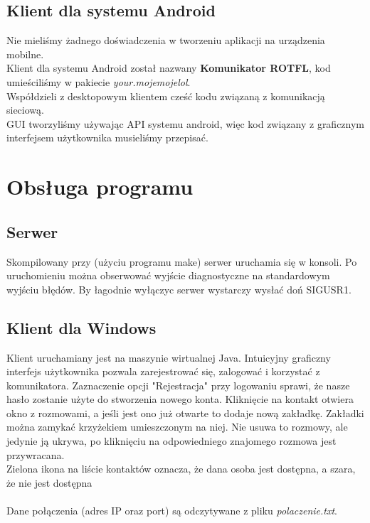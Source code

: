 \documentclass[10pt,a4paper]{article}
\begin{document}
	\subsection{Klient dla systemu Android}
		Nie mieliśmy żadnego doświadczenia w tworzeniu aplikacji na urządzenia mobilne.\\
		Klient dla systemu Android został nazwany \textbf{Komunikator ROTFL}, kod umieściliśmy w pakiecie \textit{your.mojemojelol}.\\
		Współdzieli z desktopowym klientem cześć kodu związaną z komunikacją sieciową.\\
		GUI tworzyliśmy używając API systemu android, więc kod związany z graficznym interfejsem użytkownika musieliśmy  przepisać.
	
\section{Obsługa programu}
	\subsection{Serwer}
		Skompilowany przy (użyciu programu make) serwer uruchamia się w konsoli.
		Po uruchomieniu można obserwować wyjście diagnostyczne na standardowym wyjściu błędów.
		By łagodnie wyłączyc serwer wystarczy wysłać doń SIGUSR1.
	\subsection{Klient dla Windows}
		Klient uruchamiany jest na maszynie wirtualnej Java.
		Intuicyjny graficzny interfejs użytkownika pozwala zarejestrować się, zalogować i korzystać z komunikatora.
		Zaznaczenie opcji "Rejestracja" przy logowaniu sprawi, że nasze hasło zostanie użyte do stworzenia nowego konta.
		Kliknięcie na kontakt otwiera okno z rozmowami, a jeśli jest ono już otwarte to dodaje nową zakładkę.
		Zakładki można zamykać krzyżekiem umieszczonym na niej. Nie usuwa to rozmowy, ale jedynie ją ukrywa, po kliknięciu
		na odpowiedniego znajomego rozmowa jest przywracana. \\
		Zielona ikona na liście kontaktów oznacza, że dana osoba jest dostępna, a szara, że nie jest dostępna \\ \\
		Dane połączenia (adres IP oraz port) są odczytywane z pliku \textit{polaczenie.txt}.
\end{document}
